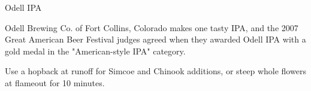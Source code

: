\begin{recipie}{Odell IPA}

\begin{aboutblock}
Odell Brewing Co. of Fort Collins, Colorado makes one tasty IPA, and the 2007 Great American
Beer Festival judges agreed when they awarded Odell IPA with a gold medal in the
"American-style IPA" category.
\end{aboutblock}


\begin{methodandtiming}
 
\begin{mashsteps}
\end{mashsteps}

\begin{fermentationsteps}
\end{fermentationsteps}

\begin{directions}
Use a hopback at runoff for  Simcoe and Chinook additions, or steep whole flowers
at flameout for 10 minutes.
\end{directions}

\end{methodandtiming}

\pagebreak

\begin{ingredientsblock}

\begin{malts}
\end{malts}

\begin{hops}
\end{hops}

\begin{yeasts}
\end{yeasts}

\end{ingredientsblock}

\end{recipie}

